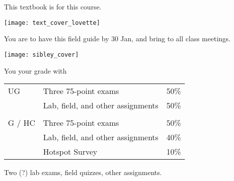 \documentclass[t,handout]{beamer}  %
\begin{document}
\begin{frame}[t,plain]{This textbook is  for this course.}
	\begin{center}
		\vspace{-\baselineskip}
		\texttt{[image: text\_cover\_lovette]}
	\end{center}
\end{frame}

\begin{frame}[t,plain]{You are  to have this field guide by 30 Jan, and bring to all class meetings.}
	\begin{center}
		\vspace{-\baselineskip}
		\texttt{[image: sibley\_cover]}
	\end{center}
\end{frame}

%
\begin{frame}[t]{You  your grade with}
	\begin{center}\large\begin{tabular}{@{}lll@{}}
	UG		&	Three 75-point exams 				& 	50\% \\
			&	Lab, field, and other assignments	&   50\% \\
			&										&	\\
	G / HC	&	Three 75-point exams 				& 	50\% \\
			&	Lab, field, and other assignments	&   40\% \\
			&	Hotspot Survey 						&	10\% \\
		\end{tabular}
	\end{center}

\hangpara Two (?) lab exams, field quizzes, other assignments.

\end{frame}

%
%
%
%
%	
%	
%	
%	
\end{document}
